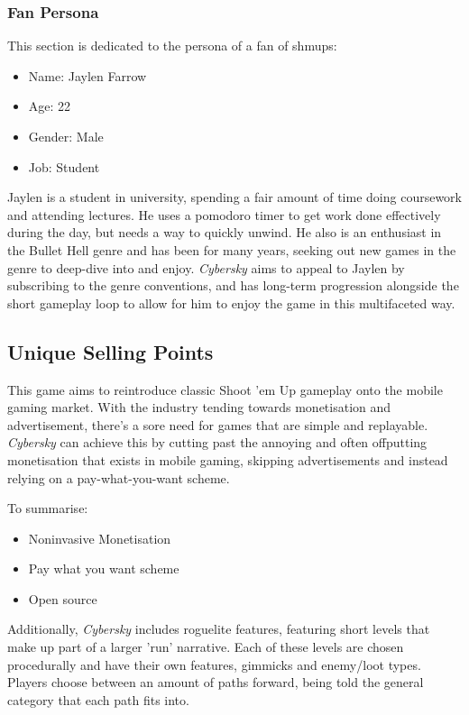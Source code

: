 \documentclass{scrartcl}
\begin{document}
\subsubsection{Fan Persona}

This section is dedicated to the persona of a fan of shmups:

\begin{itemize}
  \item Name: Jaylen Farrow
  \item Age: 22
  \item Gender: Male
  \item Job: Student
\end{itemize}

Jaylen is a student in university, spending a fair amount of time doing coursework and attending lectures. He uses a pomodoro timer to get work done effectively during the day, but needs a way to quickly unwind. He also is an enthusiast in the Bullet Hell genre and has been for many years, seeking out new games in the genre to deep-dive into and enjoy. \emph{Cybersky} aims to appeal to Jaylen by subscribing to the genre conventions, and has long-term progression alongside the short gameplay loop to allow for him to enjoy the game in this multifaceted way.

\subsection{Unique Selling Points}

This game aims to reintroduce classic Shoot 'em Up gameplay onto the mobile gaming market. With the industry tending towards monetisation and advertisement, there's a sore need for games that are simple and replayable. \emph{Cybersky} can achieve this by cutting past the annoying and often offputting monetisation that exists in mobile gaming, skipping advertisements and instead relying on a pay-what-you-want scheme.

To summarise:

\begin{itemize}
  \item Noninvasive Monetisation
  \item Pay what you want scheme
  \item Open source
\end{itemize}

Additionally, \emph{Cybersky} includes roguelite features, featuring short levels that make up part of a larger 'run' narrative. Each of these levels are chosen procedurally and have their own features, gimmicks and enemy/loot types. Players choose between an amount of paths forward, being told the general category that each path fits into.
\end{document}
